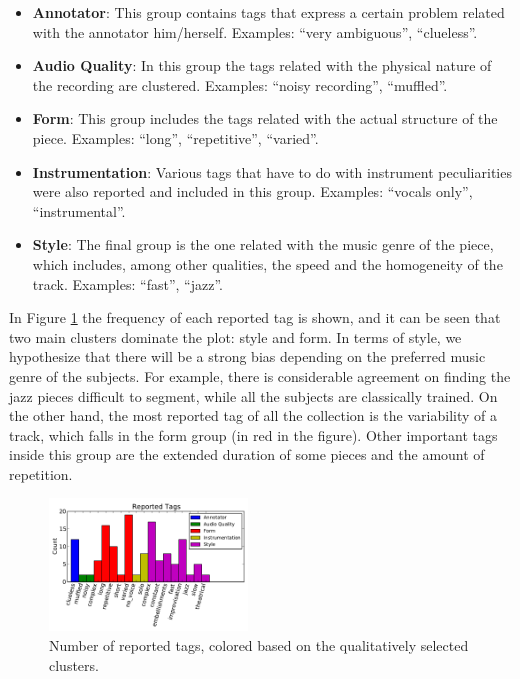 \documentclass{article}
\begin{document}
\begin{itemize}
  \item
    \textbf{Annotator}: This group contains tags that express a certain problem related with the annotator him/herself. 
    Examples: ``very ambiguous'', ``clueless''.

  \item
    \textbf{Audio Quality}: In this group the tags related with the physical nature of the recording are clustered. 
    Examples: ``noisy recording'', ``muffled''.

  \item
    \textbf{Form}: This group includes the tags related with the actual structure of the piece. Examples: ``long'', ``repetitive'', ``varied''.

  \item
    \textbf{Instrumentation}: Various tags that have to do with instrument peculiarities were also reported and included in this group. Examples: ``vocals only'', ``instrumental''.

  \item
    \textbf{Style}: The final group is the one related with the music genre of the piece, which includes, among other qualities, the speed and the homogeneity of the track. Examples: ``fast'', ``jazz''.
\end{itemize}

In Figure \ref{fig:difficult-tags-type} the frequency of each reported tag is shown, and it can be seen that two main clusters dominate the plot: style and form.
In terms of style, we hypothesize that there will be a strong bias depending on the preferred music genre of the subjects.
For example, there is considerable agreement on finding the jazz pieces difficult to segment, while all the subjects are classically trained.
On the other hand, the most reported tag of all the collection is the variability of a track, which falls in the form group (in red in the figure).
Other important tags inside this group are the extended duration of some pieces and the amount of repetition.

\begin{figure}
  \centering
  \includegraphics[width=0.47\textwidth]{plots/reported-tags.pdf}
  \caption{Number of reported tags, colored based on the qualitatively selected clusters.}
  \label{fig:difficult-tags-type}
\end{figure}%
\end{document}
